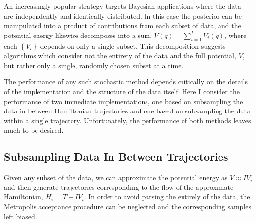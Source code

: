 \documentclass{article}
\begin{document}
An increasingly popular strategy targets Bayesian applications where the data are 
independently and identically distributed.  In this case the posterior can be manipulated
into a product of contributions from each subset of data, and the potential energy
likewise decomposes into a sum,
%
$V (q) = \sum_{i = 1}^{I} V_{i} (q)$,
%
where each $\left\{ V_{i} \right\}$ depends on only a single subset.  This decomposition 
suggests algorithms which consider not the entirety of the data and the full potential, $V$, 
but rather only a single, randomly chosen subset at a time.

The performance of any such stochastic method depends critically on the details
of the implementation and the structure of the data itself.  Here I consider
the performance of two immediate implementations, one based on subsampling the
data in between Hamiltonian trajectories and one based on subsampling the data
within a single trajectory.  Unfortunately, the performance of both methods leaves
much to be desired.

\subsection{Subsampling Data In Between Trajectories}

Given any subset of the data, we can approximate the potential energy as 
$V \approx I V_{i}$ and then generate trajectories corresponding to the flow of the 
approximate Hamiltonian, $H_{i} = T + I V_{i}$.  In order to avoid parsing the entirely
of the data, the Metropolis acceptance procedure can be neglected and the 
corresponding samples left biased.
\end{document}
